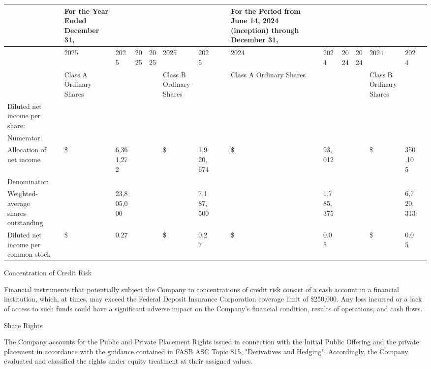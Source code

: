\documentclass[11pt,a4paper]{article}
\begin{document}
\begin{table}[h]
\begin{tabular}{|l|l|l|l|l|l|l|l|l|l|l|l|l|l|l|l|l|}
\hline
 &  & For the Year Ended December 31, &  &  &  &  &  &  &  & For the Period from June 14, 2024 (inception) through December 31, &  &  &  &  &  &  \\ \hline
 &  & 2025 & 2025 & 2025 & 2025 & 2025 & 2025 &  &  & 2024 & 2024 & 2024 & 2024 & 2024 & 2024 &  \\ \hline
 &  & Class A Ordinary Shares &  &  &  & Class B Ordinary Shares &  &  &  & Class A Ordinary Shares &  &  &  & Class B Ordinary Shares &  &  \\ \hline
Diluted net income per share: &  &  &  &  &  &  &  &  &  &  &  &  &  &  &  &  \\ \hline
Numerator: &  &  &  &  &  &  &  &  &  &  &  &  &  &  &  &  \\ \hline
Allocation of net income &  & \$ & 6,361,272 &  &  & \$ & 1,920,674 &  &  & \$ & 93,012 &  &  & \$ & 350,105 &  \\ \hline
Denominator: &  &  &  &  &  &  &  &  &  &  &  &  &  &  &  &  \\ \hline
Weighted-average shares outstanding &  &  & 23,805,000 &  &  &  & 7,187,500 &  &  &  & 1,785,375 &  &  &  & 6,720,313 &  \\ \hline
Diluted net income per common stock &  & \$ & 0.27 &  &  & \$ & 0.27 &  &  & \$ & 0.05 &  &  & \$ & 0.05 &  \\ \hline
\end{tabular}
\end{table}

Concentration of Credit Risk

Financial instruments that potentially subject the Company to concentrations of credit risk consist of a cash account in a financial institution, which, at times, may exceed the Federal Deposit Insurance Corporation coverage limit of \$250,000. Any loss incurred or a lack of access to such funds could have a significant adverse impact on the Company's financial condition, results of operations, and cash flows.

Share Rights

The Company accounts for the Public and Private Placement Rights issued in connection with the Initial Public Offering and the private placement in accordance with the guidance contained in FASB ASC Topic 815, "Derivatives and Hedging". Accordingly, the Company evaluated and classified the rights under equity treatment at their assigned values.
\end{document}
